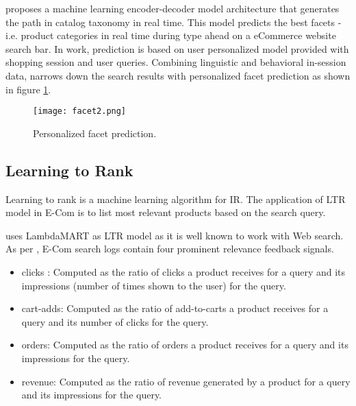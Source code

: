 \parencite{Tagliabue.26052020} proposes a machine learning encoder-decoder model architecture that generates the path in catalog taxonomy in real time. This model predicts the best facets - i.e. product categories in real time during type ahead on a eCommerce website search bar. In \parencite{Tagliabue.26052020} work, prediction is based on user personalized model provided with shopping session and user queries. Combining linguistic and behavioral in-session data, narrows down the search results with personalized facet prediction as shown in figure \ref{fig:Personalized facet prediction}. 




\begin{figure}[H]
    \centering    
    \texttt{[image: facet2.png]}
    \caption{Personalized facet prediction. \parencite{Tagliabue.26052020}}
    \label{fig:Personalized facet prediction}
\end{figure}


\subsection*{Learning to Rank}

Learning to rank is a machine learning algorithm for \acf{IR}. The application of \acf{LTR} model in E-Com is to list most relevant products based on the search query. 

\parencite{KarmakerSantu.2017} uses LambdaMART \parencite{burges2010from} as  \acs{LTR} model as it is well known to work with Web search. As per \parencite{KarmakerSantu.2017}, E-Com search logs contain four prominent relevance feedback signals.

\begin{itemize}
    \item clicks : Computed as the ratio of clicks a product receives for a query and its impressions (number of times shown to the user) for the query.
    \item cart-adds: Computed as the ratio of add-to-carts a product receives for a query and its number of clicks for the query.
    \item orders: Computed as the ratio of orders a product receives for a query and its impressions for the query.
    \item revenue: Computed as the ratio of revenue generated by a product for a query and its impressions for the query.

\end{itemize}

